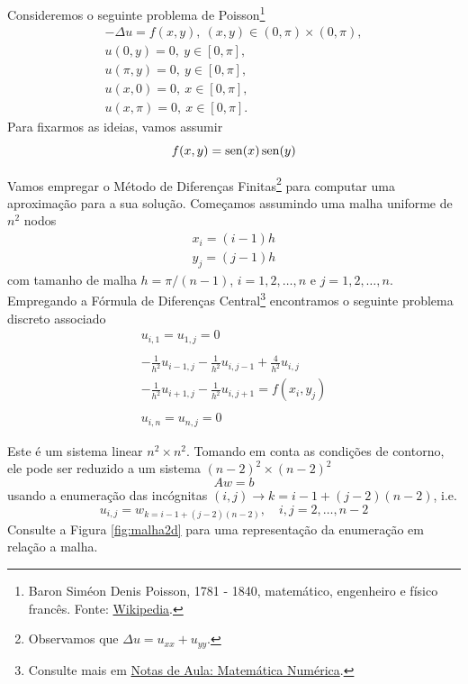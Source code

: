\begin{ex}\label{ex:poisson}
  Consideremos o seguinte problema de Poisson\footnote{Baron Siméon Denis Poisson, 1781 - 1840, matemático, engenheiro e físico francês. Fonte: \href{https://en.wikipedia.org/wiki/Sim\%C3\%A9on_Denis_Poisson}{Wikipedia}.}
  \begin{gather}
    - \Delta u = f(x,y),~(x, y)\in (0, \pi)\times (0, \pi),\\
    u(0, y) = 0,~y\in [0, \pi],\\
    u(\pi, y) = 0,~y\in [0, \pi],\\
    u(x, 0) = 0,~x\in [0, \pi],\\
    u(x, \pi) = 0,~x\in [0, \pi].
  \end{gather}
  Para fixarmos as ideias, vamos assumir
  \begin{equation}
    f(x,y) = \operatorname{sen}(x)\operatorname{sen}(y)
  \end{equation}
  
  Vamos empregar o Método de Diferenças Finitas\footnote{Observamos que $\Delta u = u_{xx} + u_{yy}$.} para computar uma aproximação para a sua solução. Começamos assumindo uma malha uniforme de $n^2$ nodos
  \begin{gather}
    x_i = (i-1)h\\
    y_j = (j-1)h
  \end{gather}
  com tamanho de malha $h = \pi/(n-1)$, $i=1,2,\dotsc,n$ e $j=1,2,\dotsc,n$. Empregando a Fórmula de Diferenças Central\footnote{Consulte mais em \href{https://phkonzen.github.io/notas/MatematicaNumerica/cap_edp_sec_Poisson.html}{Notas de Aula: Matemática Numérica}.} encontramos o seguinte problema discreto associado
  \begin{gather}
    u_{i, 1} = u_{1, j} = 0\\
    ~\nonumber\\
    - \frac{1}{h^2}u_{i-1,j} - \frac{1}{h^2}u_{i,j-1} + \frac{4}{h^2}u_{i,j} \nonumber\\
    - \frac{1}{h^2}u_{i+1,j} - \frac{1}{h^2}u_{i,j+1} = f(x_i, y_j)\\
    ~\nonumber\\
    u_{i,n} = u_{n,j} = 0
  \end{gather}

  Este é um sistema linear $n^2 \times n^2$. Tomando em conta as condições de contorno, ele pode ser reduzido a um sistema $(n-2)^2\times (n-2)^2$
  \begin{equation}
    Aw = b
  \end{equation}
  usando a enumeração das incógnitas $(i,j) \rightarrow k=i-1 + (j-2)(n-2)$, i.e.
  \begin{equation}
    u_{i,j} = w_{k=i-1 + (j-2)(n-2)},\quad i,j=2,\dotsc,n-2
  \end{equation}
  Consulte a Figura \ref{fig:malha2d} para uma representação da enumeração em relação a malha.


\end{ex}
